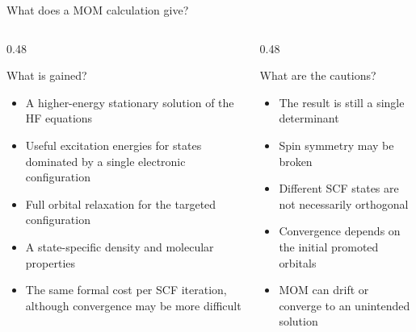 \documentclass[aspectratio=169,9pt]{beamer}
\newcommand{\cmark}{\textbf{\green{\ding{51}}}}
\newcommand{\xmark}{\textbf{\red{\ding{55}}}}
\newcommand{\red}[1]{\textcolor{hfRed}{#1}}
\newcommand{\green}[1]{\textcolor{hfGreen}{#1}}
\begin{document}

\begin{frame}{What does a MOM calculation give?}
	\begin{columns}[T]
		\begin{column}{0.48\textwidth}
			\begin{block}{What is gained?}
				\begin{itemize}
					\item[\cmark] A higher-energy stationary solution of the HF equations
					\bigskip
					\item[\cmark] Useful excitation energies for states dominated by a single electronic configuration
					\bigskip
					\item[\cmark] Full orbital relaxation for the targeted configuration
					\bigskip
					\item[\cmark] A state-specific density and molecular properties
					\bigskip
					\item[\cmark] The same formal cost per SCF iteration, although convergence may be more difficult
				\end{itemize}
			\end{block}
		\end{column}
		\begin{column}{0.48\textwidth}
			\begin{block}{What are the cautions?}
				\begin{itemize}
					\item[\xmark] The result is still a single determinant
					\bigskip
					\item[\xmark] Spin symmetry may be broken
					\bigskip
					\item[\xmark] Different SCF states are not necessarily orthogonal
					\bigskip
					\item[\xmark] Convergence depends on the initial promoted orbitals
					\bigskip
					\item[\xmark] MOM can drift or converge to an unintended solution
				\end{itemize}
			\end{block}
		\end{column}
	\end{columns}
\end{frame}

\end{document}
